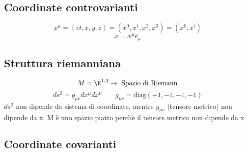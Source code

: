 \subsection*{Coordinate controvarianti}
\begin{equation*}
    x^\mu = (ct,x,y,z) = (x^0,x^1,x^2,x^3) = (x^0,x^i)
\end{equation*}
\begin{equation*}
    x = x^\mu \hat{e}_\mu
\end{equation*}

\subsection*{Struttura riemanniana}
\begin{equation*}
    M = \R^{1,3} \rightarrow \text{ Spazio di Riemann}
\end{equation*}
\begin{equation*}
    ds^2 = g_{\mu\nu} dx^\mu dx^\nu  \qquad g_{\mu\nu} = \mbox{diag}(+1,-1,-1,-1)
\end{equation*}
$ds^2$ non dipende da sistema di coordinate, mentre $g_{\mu\nu}$ (tensore metrico) non dipende da x. M è uno spazio piatto perchè il tensore metrico non dipende da x

\subsection*{Coordinate covarianti}
